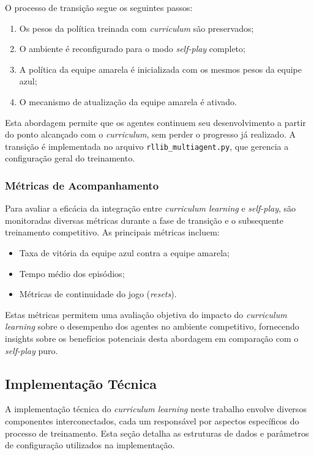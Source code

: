 O processo de transição segue os seguintes passos:

\begin{enumerate}
    \item Os pesos da política treinada com \textit{curriculum} são preservados;
    \item O ambiente é reconfigurado para o modo \textit{self-play} completo;
    \item A política da equipe amarela é inicializada com os mesmos pesos da equipe azul;
    \item O mecanismo de atualização da equipe amarela é ativado.
\end{enumerate}

Esta abordagem permite que os agentes continuem seu desenvolvimento a partir do ponto alcançado com o \textit{curriculum}, sem perder o progresso já realizado. A transição é implementada no arquivo \texttt{rllib\_multiagent.py}, que gerencia a configuração geral do treinamento.

\subsubsection{Métricas de Acompanhamento}

Para avaliar a eficácia da integração entre \textit{curriculum learning} e \textit{self-play}, são monitoradas diversas métricas durante a fase de transição e o subsequente treinamento competitivo. As principais métricas incluem:

\begin{itemize}
    \item Taxa de vitória da equipe azul contra a equipe amarela;
    \item Tempo médio dos episódios;
    \item Métricas de continuidade do jogo (\textit{resets}).
\end{itemize}

Estas métricas permitem uma avaliação objetiva do impacto do \textit{curriculum learning} sobre o desempenho dos agentes no ambiente competitivo, fornecendo insights sobre os benefícios potenciais desta abordagem em comparação com o \textit{self-play} puro.

\subsection{Implementação Técnica}
\label{subsec:implementacao_tecnica}

A implementação técnica do \textit{curriculum learning} neste trabalho envolve diversos componentes interconectados, cada um responsável por aspectos específicos do processo de treinamento. Esta seção detalha as estruturas de dados e parâmetros de configuração utilizados na implementação.

